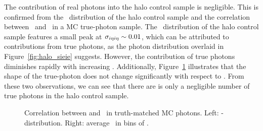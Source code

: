 The contribution of real photons into the halo control sample is negligible.
This is confirmed from the \sieie\ distribution of the halo control sample and the correlation between \sieie\ and \emip\ in a MC true-photon sample.
The \sieie\ distribution of the halo control sample features a small peak at $\sigma_{i\eta i\eta} \sim 0.01$, which can be attributed to contributions from true photons, as the photon \sieie distribution overlaid in Figure~\ref{fig:halo_sieie} suggests. 
However, the contribution of true photons diminishes rapidly with increasing \sieie. 
Additionally, Figure~\ref{fig:sieie_mip_corr} illustrates that the shape of the true-photon \sieie does not change significantly with respect to \emip. 
From these two observations, we can see that there are is only a negligible number of true photons in the halo control sample.

\begin{figure}[htbp]
  \centering
  \caption{
    Correlation between \sieie and \emip\ in truth-matched MC photons. 
    Left: \emip-\sieie distribution.
    Right: average \emip\ in bins of \sieie.
  }
  \label{fig:sieie_mip_corr}
\end{figure}

